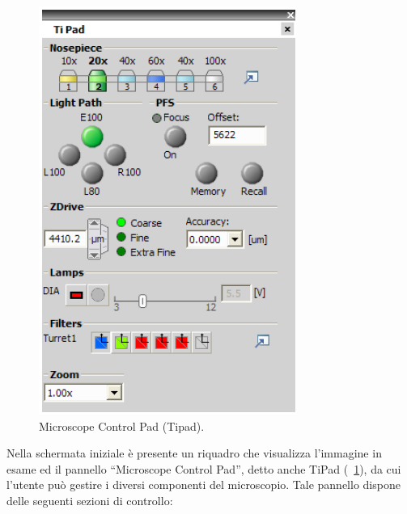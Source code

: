 \begin{figure}
 \centering
 \includegraphics[scale=.40]{img/CAP2pannello.png}
 \caption{\small{Microscope Control Pad (Tipad).}}
 \label{fig:pannello}
\end{figure}

Nella schermata iniziale è presente un riquadro che visualizza l'immagine in esame ed il pannello ``Microscope Control Pad'', detto anche TiPad (\figurename~\ref{fig:pannello}), da cui l'utente può gestire i diversi componenti del microscopio. 
Tale pannello dispone delle seguenti sezioni di controllo:

